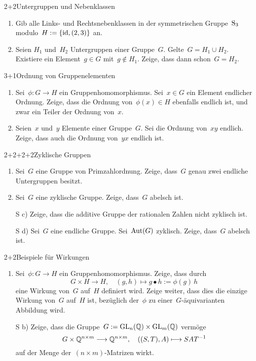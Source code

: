 \documentclass{algblatt}
\begin{document}

\begin{aufgabe}{2+2}{Untergruppen und Nebenklassen}
\begin{enumerate}
\item
Gib alle Links- und Rechtsnebenklassen in der symmetrischen Gruppe~$\mathrm{S}_3$
modulo~$H := \{ \mathrm{id}, (2,3) \}$ an.
\item Seien $H_1$ und~$H_2$ Untergruppen einer Gruppe~$G$. Gelte~$G = H_1 \cup
H_2$. Existiere ein Element~$g \in G$ mit~$g \not\in H_1$. Zeige, dass dann schon~$G
= H_2$.
\end{enumerate}
\end{aufgabe}

\begin{aufgabe}{3+1}{Ordnung von Gruppenelementen}
\begin{enumerate}
\item Sei~$\phi : G \to H$ ein Gruppenhomomorphismus. Sei~$x \in G$ ein Element
endlicher Ordnung. Zeige, dass die Ordnung von~$\phi(x) \in H$ ebenfalls
endlich ist, und zwar ein Teiler der Ordnung von~$x$.
\item Seien~$x$ und~$y$ Elemente einer Gruppe~$G$. Sei die Ordnung von~$xy$
endlich. Zeige, dass auch die Ordnung von~$yx$ endlich ist.
\end{enumerate}
\end{aufgabe}

\begin{aufgabe}{2+2+2+2}{Zyklische Gruppen}
\begin{enumerate}
\item Sei~$G$ eine Gruppe von Primzahlordnung. Zeige, dass~$G$ genau
zwei endliche Untergruppen besitzt.
\item Sei~$G$ eine zyklische Gruppe. Zeige, dass~$G$ abelsch ist.
\item[S c)] Zeige, dass die additive Gruppe der rationalen Zahlen nicht zyklisch ist.
\item[S d)] Sei~$G$ eine endliche Gruppe. Sei~$\mathrm{Aut}(G)$ zyklisch.
Zeige, dass~$G$ abelsch ist.
\end{enumerate}
\end{aufgabe}

\begin{aufgabe}{2+2}{Beispiele für Wirkungen}
\begin{enumerate}
\item Sei~$\phi : G \to H$ ein Gruppenhomomorphismus. Zeige, dass durch
\[ G \times H \longrightarrow H, \quad (g,h) \longmapsto g \bullet h := \phi(g)\,h
\]
eine Wirkung von~$G$ auf~$H$ definiert wird. Zeige weiter, dass dies die
einzige Wirkung von~$G$ auf~$H$ ist, bezüglich der~$\phi$ zu
einer~$G$-äquivarianten Abbildung wird.
\item[S b)] Zeige, dass die Gruppe~$G := \mathrm{GL}_n(\mathbb{Q}) \times \mathrm{GL}_m(\mathbb{Q})$ vermöge
\[ G \times \mathbb{Q}^{n \times m} \longrightarrow \mathbb{Q}^{n \times m}, \quad
  ((S,T), A) \longmapsto SAT^{-1} \]
auf der Menge der~$(n \times m)$-Matrizen wirkt.
\end{enumerate}
\end{aufgabe}
\end{document}
